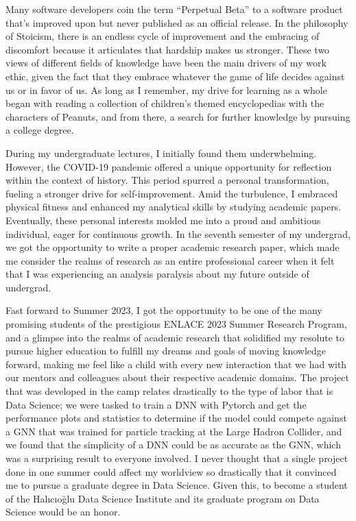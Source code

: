	\noindent
	Many software developers coin the term “Perpetual Beta” to a software product that's improved upon but 
	never published as an official release. In the philosophy of Stoicism, there is an endless cycle of improvement 
	and the embracing of discomfort because it articulates that hardship makes us stronger. These two views of different 
	fields of knowledge have been the main drivers of my work ethic, given the fact that they embrace whatever the game 
	of life decides against us or in favor of us. As long as I remember, my drive for learning as a whole began with 
	reading a collection of children's themed encyclopedias with the characters of Peanuts, and from there, a search for 
	further knowledge by pursuing a college degree.
	
	\setlength{\parindent}{.3in}
	  
	During my undergraduate lectures, I initially found them underwhelming. However, the COVID-19 pandemic offered a unique opportunity 
	for reflection within the context of history. This period spurred a personal transformation, fueling a stronger drive for self-improvement. 
	Amid the turbulence, I embraced physical fitness and enhanced my analytical skills by studying academic papers. Eventually, these
	personal interests molded me into a proud and ambitious individual, eager for continuous growth. In the seventh semester
	of my undergrad, we got the opportunity to write a proper academic research paper, which made me consider the realms of 
	research as an entire professional career when it felt that I was experiencing an analysis paralysis about my future outside of undergrad.
	
	Fast forward to Summer 2023, I got the opportunity to be one of the many promising students of the prestigious ENLACE 2023 Summer 
	Research Program, and a glimpse into the realms of academic research that solidified my resolute to pursue higher education to 
	fulfill my dreams and goals of moving knowledge forward, making me feel like a child with every new interaction that we 
	had with our mentors and colleagues about their respective academic domains. The project that was developed in the
	camp relates drastically to the type of labor that is Data Science; we were tasked to train a DNN with Pytorch and 
	get the performance plots and statistics to determine if the model could compete against a GNN that was trained for particle
	tracking at the Large Hadron Collider, and we found that the simplicity of a DNN could be as accurate as the GNN, which was a surprising
	result to everyone involved. I never thought that a single project done in one summer could affect my worldview so 
	drastically that it convinced me to pursue a graduate degree in Data Science. Given this, to become
	a student of the Halıcıoğlu Data Science Institute and its graduate program on Data Science would be an honor.
	
